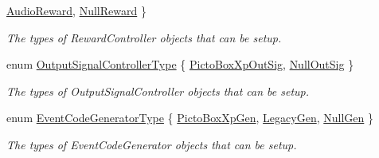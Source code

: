 \begin{DoxyCompactItemize}
\hyperlink{class_hardware_setup_adca8a1e846871351eea56002364cd9bfa0ce47924401e928d7c26f2d4a209d066}{Audio\-Reward}, 
\hyperlink{class_hardware_setup_adca8a1e846871351eea56002364cd9bfa6d983e58d740737e1054ee313b2771a0}{Null\-Reward}
 \}
\begin{DoxyCompactList}\small\item\em The types of Reward\-Controller objects that can be setup. \end{DoxyCompactList}\item 
enum \hyperlink{class_hardware_setup_a7bf652582f22ceef095add24e855625b}{Output\-Signal\-Controller\-Type} \{ \hyperlink{class_hardware_setup_a7bf652582f22ceef095add24e855625baefde555de40121d74b7f8f80c1a326eb}{Picto\-Box\-Xp\-Out\-Sig}, 
\hyperlink{class_hardware_setup_a7bf652582f22ceef095add24e855625ba64fe06dc1692650e0396f9577e0eac9a}{Null\-Out\-Sig}
 \}
\begin{DoxyCompactList}\small\item\em The types of Output\-Signal\-Controller objects that can be setup. \end{DoxyCompactList}\item 
enum \hyperlink{class_hardware_setup_a5577404a1cb597cc0d78bc56c9acac00}{Event\-Code\-Generator\-Type} \{ \hyperlink{class_hardware_setup_a5577404a1cb597cc0d78bc56c9acac00a55e2be5d03b6c1117ad83174ebbb0821}{Picto\-Box\-Xp\-Gen}, 
\hyperlink{class_hardware_setup_a5577404a1cb597cc0d78bc56c9acac00a364e643a917643be23fd73c9cadbe20e}{Legacy\-Gen}, 
\hyperlink{class_hardware_setup_a5577404a1cb597cc0d78bc56c9acac00a68b2acabc843c750fdd9297f65959c39}{Null\-Gen}
 \}
\begin{DoxyCompactList}\small\item\em The types of Event\-Code\-Generator objects that can be setup. \end{DoxyCompactList}\end{DoxyCompactItemize}
